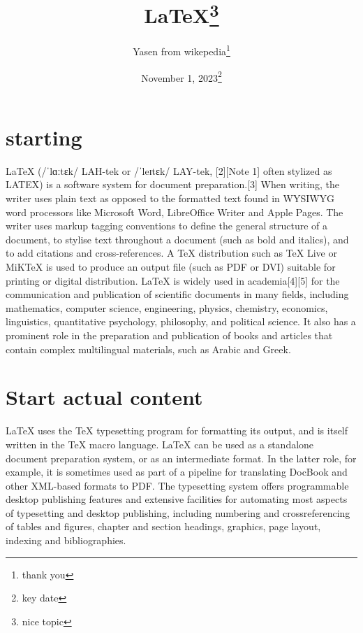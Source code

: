 \documentclass[]{report}
\title{LaTeX\thanks{nice topic}}
\author{Yasen from wikepedia\thanks{thank you}}
\date{November 1, 2023\thanks{key date}}
\begin{document}
	\maketitle
	
	\tableofcontents
	
	\chapter{starting}LaTeX (/ˈlɑːtɛk/ LAH-tek or /ˈleɪtɛk/ LAY-tek,
	[2][Note 1] often
	stylized as LATEX) is a software system for document
	preparation.[3] When writing, the writer uses plain text as
	opposed to the formatted text found in WYSIWYG word
	processors like Microsoft Word, LibreOffice Writer and Apple
	Pages. The writer uses markup tagging conventions to define the
	general structure of a document, to stylise text throughout a
	document (such as bold and italics), and to add citations and
	cross-references. A TeX distribution such as TeX Live or
	MiKTeX is used to produce an output file (such as PDF or DVI)
	suitable for printing or digital distribution.
	LaTeX is widely used in academia[4][5]
	for the communication
	and publication of scientific documents in many fields,
	including mathematics, computer science, engineering, physics,
	chemistry, economics, linguistics, quantitative psychology,
	philosophy, and political science. It also has a prominent role in
	the preparation and publication of books and articles that
	contain complex multilingual materials, such as Arabic and
	Greek.
	
	\chapter{Start actual content} LaTeX uses the TeX typesetting program for
	formatting its output, and is itself written in the TeX macro
	language.
	LaTeX can be used as a standalone document preparation
	system, or as an intermediate format. In the latter role, for
	example, it is sometimes used as part of a pipeline for
	translating DocBook and other XML-based formats to PDF. The
	typesetting system offers programmable desktop publishing features and extensive facilities for
	automating most aspects of typesetting and desktop publishing, including numbering and crossreferencing of tables and figures, chapter and section headings, graphics, page layout, indexing and
	bibliographies.
	
\end{document}
